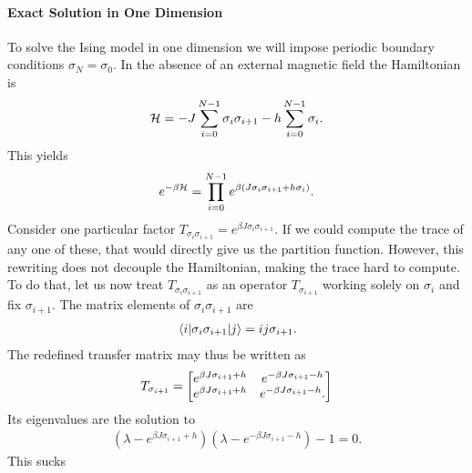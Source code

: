 \paragraph{Exact Solution in One Dimension}
To solve the Ising model in one dimension we will impose periodic boundary conditions $\sigma_{N} = \sigma_{0}$. In the absence of an external magnetic field the Hamiltonian is
\begin{align*}
	\mathcal{H} = -J\sum\limits_{i = 0}^{N - 1}\sigma_{i}\sigma_{i + 1} - h\sum\limits_{i = 0}^{N - 1}\sigma_{i}.
\end{align*}
This yields
\begin{align*}
	e^{-\beta\mathcal{H}} = \prod\limits_{i = 0}^{N - 1}e^{\beta(J\sigma_{i}\sigma_{i + 1} + h\sigma_{i})}.
\end{align*}
Consider one particular factor $T_{\sigma_{i}\sigma_{i + 1}} = e^{\beta J\sigma_{i}\sigma_{i + 1}}$. If we could compute the trace of any one of these, that would directly give us the partition function. However, this rewriting does not decouple the Hamiltonian, making the trace hard to compute. To do that, let us now treat $T_{\sigma_{i}\sigma_{i + 1}}$ as an operator $T_{\sigma_{i + 1}}$ working solely on $\sigma_{i}$ and fix $\sigma_{i + 1}$. The matrix elements of $\sigma_{i}\sigma_{i + 1}$ are
\begin{align*}
	\mel{i}{\sigma_{i}\sigma_{i + 1}}{j} = ij\sigma_{i + 1}.
\end{align*}
The redefined transfer matrix may thus be written as
\begin{align*}
	T_{\sigma_{i + 1}} =
	\mqty[
		e^{\beta J \sigma_{i + 1} + h} & e^{-\beta J \sigma_{i + 1} - h} \\
		e^{\beta J \sigma_{i + 1} + h} & e^{-\beta J \sigma_{i + 1} - h}.
	]
\end{align*}
Its eigenvalues are the solution to
\begin{align*}
	\left(\lambda - e^{\beta J \sigma_{i + 1} + h}\right)\left(\lambda - e^{-\beta J \sigma_{i + 1} - h}\right) - 1 = 0.
\end{align*}
This sucks

